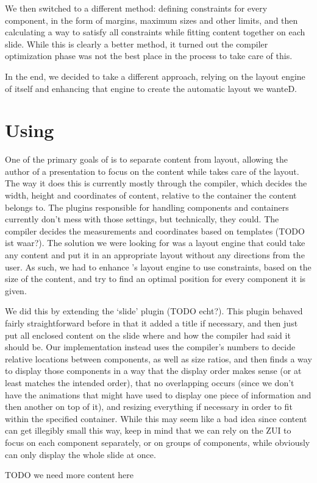   We then switched to a different method: defining constraints for every
   component, in the form of margins, maximum sizes and other limits, and then
   calculating a way to satisfy all constraints while fitting content together
   on each slide. While this is clearly a better method, it turned out the
   compiler optimization phase was not the best place in the process to take
   care of this.

   In the end, we decided to take a different approach, relying on the layout
   engine of \mxp itself and enhancing that engine to create the automatic
   layout we wanteD.

  \section{Using \mxp}

   One of the primary goals of \mxp is to separate content from layout,
   allowing the author of a presentation to focus on the content while \mxp
   takes care of the layout. The way it does this is currently mostly through
   the compiler, which decides the width, height and coordinates of content,
   relative to the container the content belongs to. The plugins responsible
   for handling components and containers currently don't mess with those
   settings, but technically, they could. The compiler decides the measurements
   and coordinates based on templates (TODO ist waar?). The solution we were
   looking for was a layout engine that could take any content and put it in an
   appropriate layout without any directions from the user. As such, we had to
   enhance \mxp's layout engine to use constraints, based on the size of the
   content, and try to find an optimal position for every component it is
   given.

   We did this by extending the `slide' plugin (TODO echt?). This plugin
   behaved fairly straightforward before in that it added a title if necessary,
   and then just put all enclosed content on the slide where and how the
   compiler had said it should be. Our implementation instead uses the
   compiler's numbers to decide relative locations between components, as well
   as size ratios, and then finds a way to display those components in a way
   that the display order makes sense (or at least matches the intended order),
   that no overlapping occurs (since we don't have the animations that \ppt
   might have used to display one piece of information and then another on top
   of it), and resizing everything if necessary in order to fit within the
   specified container. While this may seem like a bad idea since content can
   get illegibly small this way, keep in mind that we can rely on the ZUI to
   focus on each component separately, or on groups of components, while \ppt
   obviously can only display the whole slide at once.

   TODO we need more content here

